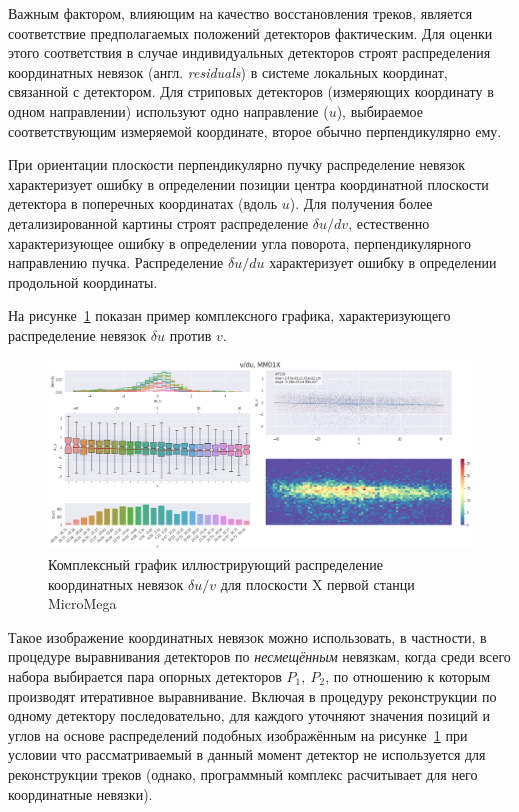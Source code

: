 Важным фактором, влияющим на качество восстановления треков, является
соответствие предполагаемых положений детекторов фактическим. Для
оценки этого соответствия в случае индивидуальных детекторов строят
распределения координатных невязок (англ. \emph{residuals}) в
системе локальных координат, связанной с детектором.
Для стриповых детекторов (измеряющих координату в одном направлении)
используют одно направление ($u$), выбираемое соответствующим измеряемой
координате, второе обычно перпендикулярно ему.

При ориентации плоскости перпендикулярно пучку распределение невязок
характеризует ошибку в определении позиции центра
координатной плоскости детектора в поперечных координатах (вдоль $u$).
Для получения более детализированной картины строят
распределение $\delta u/dv$, естественно характеризующее ошибку в определении
угла поворота, перпендикулярного направлению пучка. Распределение
$\delta u/du$ характеризует ошибку в определении продольной координаты.

На рисунке~\ref{fig:residuals-example} показан пример комплексного
графика, характеризующего распределение невязок $\delta u$ против $v$.
\begin{figure}[ht]
    \centering
    \includegraphics[width=0.95\linewidth]{images/illustrative/alignment-example.png}
    \caption{Комплексный график иллюстрирующий распределение координатных
    невязок $\delta u /v$ для плоскости X первой станци MicroMega}
    \label{fig:residuals-example}
\end{figure}

Такое изображение координатных невязок можно использовать, в частности,
в процедуре выравнивания детекторов по \emph{несмещённым} невязкам, когда
среди всего набора выбирается пара опорных детекторов $P_1,~P_2$, по отношению
к которым производят итеративное выравнивание. Включая в процедуру
реконструкции по одному детектору последовательно, для каждого уточняют
значения позиций и углов на основе распределений подобных изображённым
на рисунке~\ref{fig:residuals-example} при условии что рассматриваемый
в данный момент детектор не используется для реконструкции треков (однако,
программный комплекс расчитывает для него координатные невязки).

